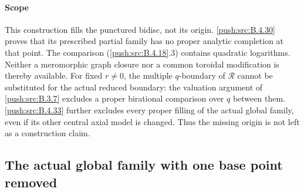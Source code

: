 \paragraph{Scope}
This construction fills the punctured bidisc, not its
origin. \ref{push:src:B.4.30} proves that its prescribed partial family
has no proper analytic completion at that point.
The comparison (\ref{push:src:B.4.18}.3) contains quadratic
logarithms. Neither a meromorphic graph closure
nor a common toroidal modification is thereby
available. For fixed $r\ne0$, the multiple
$q$-boundary of $\mathcal R$ cannot be substituted
for the actual reduced boundary: the valuation
argument of \ref{push:src:B.3.7} excludes a proper birational
comparison over $q$ between them. \ref{push:src:B.4.33} further
excludes every proper filling of the actual global family,
even if its other central axial model is changed. Thus
the missing origin is not left as a construction claim.




\subsection{The actual global family with one base point removed}


